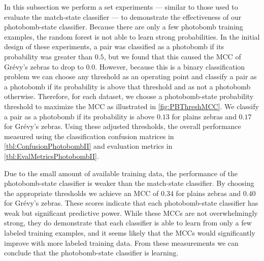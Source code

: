         In this subsection we perform a set experiments --- similar to those used to evaluate the match-state
          classifier --- to demonstrate the effectiveness of our photobomb-state classifier.
        Because there are only a few photobomb training examples, the random forest is not able to learn strong
          probabilities.
        In the initial design of these experiments, a pair was classified as a photobomb if its probability was
          greater than $0.5$, but we found that this caused the MCC of Grévy's zebras to drop to $0.0$.
        However, because this is a binary classification problem we can choose any threshold as an operating
          point and classify a pair as a photobomb if its probability is above that threshold and as not a
          photobomb otherwise.
        Therefore, for each dataset, we choose a photobomb-state probability threshold to maximize the MCC as
          illustrated in \cref{fig:PBThreshMCC}.
        We classify a pair as a photobomb if its probability is above $0.13$ for plains zebras and $0.17$ for
          Grévy's zebras.
        Using these adjusted thresholds, the overall performance measured using the classification confusion
          matrices in \cref{tbl:ConfusionPhotobombII} and evaluation metrics in \cref{tbl:EvalMetricsPhotobombII}.

        \PBThreshMCC{}

        \ConfusionPhotobombII{}
        \EvalMetricsPhotobombII{}

        Due to the small amount of available training data, the performance of the photobomb-state classifier is
          weaker than the match-state classifier.
        By choosing the appropriate thresholds we achieve an MCC of $0.34$ for plains zebras and $0.40$ for
          Grévy's zebras.
        These scores indicate that each photobomb-state classifier has weak but significant predictive power.
        While these MCCs are not overwhelmingly strong, they do demonstrate that each classifier is able to learn
          from only a few labeled training examples, and it seems likely that the MCCs would significantly improve
          with more labeled training data.
        From these measurements we can conclude that the photobomb-state classifier is learning.

        \FloatBarrier{}

